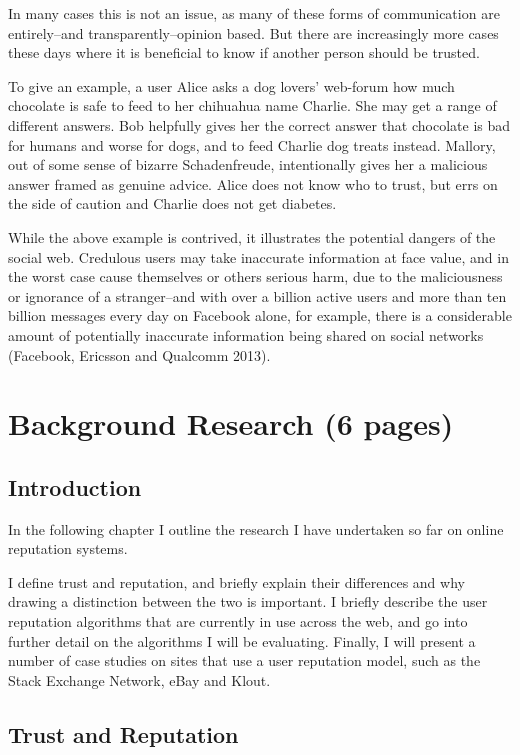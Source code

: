 \documentclass[]{final_report}
\begin{document}
In many cases this is not an issue, as many of these forms of communication are entirely--and transparently--opinion based. But there are increasingly more cases these days where it is beneficial to know if another person should be trusted.

To give an example, a user Alice asks a dog lovers' web-forum how much chocolate is safe to feed to her chihuahua name Charlie. She may get a range of different answers. Bob helpfully gives her the correct answer that chocolate is bad for humans and worse for dogs, and to feed Charlie dog treats instead. Mallory, out of some sense of bizarre Schadenfreude, intentionally gives her a malicious answer framed as genuine advice. Alice does not know who to trust, but errs on the side of caution and Charlie does not get diabetes.

While the above example is contrived, it illustrates the potential dangers of the social web. Credulous users may take inaccurate information at face value, and in the worst case cause themselves or others serious harm, due to the maliciousness or ignorance of a stranger--and with over a billion active users and more than ten billion messages every day on Facebook alone, for example, there is a considerable amount of potentially inaccurate information being shared on social networks (Facebook, Ericsson and Qualcomm 2013).

\chapter{Background Research (6 pages)}

\section{Introduction}

In the following chapter I outline the research I have undertaken so far on online reputation systems.

I define trust and reputation, and briefly explain their differences and why drawing a distinction between the two is important. I  briefly describe the user reputation algorithms that are currently in use across the web, and go into further detail on the algorithms I will be evaluating. Finally,  I will present a number of case studies on sites that use a user reputation model, such as the Stack Exchange Network, eBay and Klout.


\section{Trust and Reputation}
\end{document}
